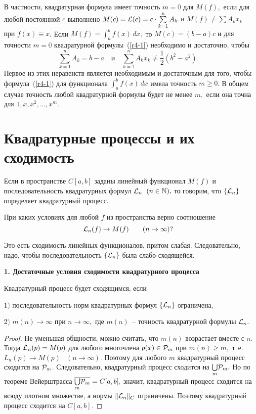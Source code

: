 В частности, квадратурная формула имеет точность $m=0$ для $M(f),$
если для любой постоянной $c$
выполнено $M(c) = \mathcal{L}(c)=c\cdot \sum\limits_{k=1}^n A_k$
{и $M(f)\ne\sum{A_kx_k}$ при $f(x)\equiv x$}.
Если $
M(f)=\displaystyle\int_a^b f(x)\, dx,$ то $M(c)=(b-a)c$
{и для точности $m=0$ квадратурной формулы~(\ref{r4-1})}
необходимо и достаточно, чтобы
\[
  \sum\limits_{k=1}^n A_k=b-a\quad \mbox{и}\quad \sum\limits_{k=1}^n
  A_kx_k\ne\frac12(b^2-a^2).
\]
Первое из этих неравенств является необходимым и
достаточным для того, чтобы формула~(\ref{r4-1}) для функционала
$\displaystyle\int_a^b f(x)\, dx$ имела точность $m\ge 0.$
В общем случае точность любой квадратурной формулы будет не менее
$m,$ если она точна для $1,x,x^2,\ldots,x^m.$

\section{Квадратурные процессы и их сходимость}

Если в пространстве
{$C[a,b]$} заданы линейный функционал
$M(f)$ и последовательность квадратурных формул
$\mathcal{L}_n$\  $(n \in \mathbb{N}),$ то говорим, что
$\{\mathcal{L}_n\}$ определяет квадратурный процесс.

\begin{task}
При каких условиях для любой $f$
из пространства верно соотношение
\[
  \mathcal{L}_n(f) \to M(f) \qquad (n \to \infty)?
\]
\end{task}

Это есть сходимость линейных функционалов, притом слабая. Следовательно, надо, чтобы
последовательность $\{\mathcal{L}_n\}$ была слабо сходящейся.

\vspace{5mm}
{\bf 1. Достаточные условия сходимости квадратурного процесса}
\vspace{5mm}

\begin{teo}\label{kvad1}
Квадратурный процесс будет сходящимся, если

$1)$ последовательность норм квадратурных формул
$\{\mathcal{L}_n\}$ ограничена,

$2)$ $m(n) \to \infty$ {при} $n \to \infty,$
где
$m(n)$~-- точность {квадратурной формулы} $\mathcal{L}_n.$
\end{teo}

\begin{proof}
{Не уменьшая общности, можно считать, что $m(n)$}
{возрастает вместе с $n.$ Тогда $\mathcal{L}_n(p)=M(p)$
для любого многочлена $p(x)\in \mathcal{P}_m$ при} {$m(n)\ge m,$
т.\,е. $L_n(p)\to M(p)$~ $(n\to\infty)$. Поэтому} для любого $m$
квадратурный процесс сходится {на $\mathcal{P}_m$}. Следовательно, квадратурный процесс
сходится на {${\bigcup\limits_m} \mathcal{P}_m.$} Но по теореме
Вейерштрасса {$\overline{{\bigcup\limits_m} \mathcal{P}_m}=C[a,b],$} значит, квадратурный процесс
сходится на всюду плотном множестве, а нормы {$\|\mathcal{L}_n\|_C$} ограничены.
Поэтому квадратурный процесс
сходится на {$C[a,b].$}
\end{proof}

